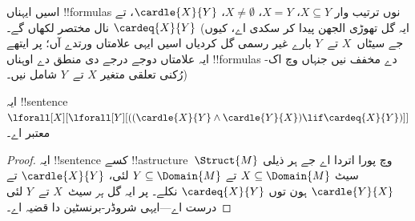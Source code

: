 \documentclass[../../../include/open-logic-section]{subfiles}
\begin{document}
اسیں ایہناں !!{formula}s نوں ترتیب وار $X \subseteq Y$،
$X = Y$، $X \neq \emptyset$، $\cardle{X}{Y}$، تے
$\cardeq{X}{Y}$ نال مختصر لکھاں گے۔ (ایہ گل تھوڑی الجھن پیدا کر
سکدی اے، کیوں جے سیٹاں~$X$ تے~$Y$ بارے غیر رسمی گل کردیاں اسیں
ایہی علامتاں ورتدے آں؛ پر ایتھے ایہ علامتاں دوجے درجے دی منطق دے
اوہناں !!{formula}s دے مخفف نیں جنہاں وچ اک-رُکنی تعلقی متغیر
$X$ تے~$Y$ شامل نیں۔)

\begin{prop}
ایہ !!{sentence} $\lforall[X][\lforall[Y][((\cardle{X}{Y} \land
    \cardle{Y}{X}) \lif \cardeq{X}{Y})]]$ معتبر اے۔
\end{prop}

\begin{proof}
ایہ !!{sentence} کسے !!a{structure}~$\Struct{M}$ وچ پورا اتردا اے جے
ہر ذیلی سیٹ $X \subseteq \Domain{M}$ تے $Y \subseteq \Domain{M}$ لئی،
$\cardle{X}{Y}$ تے $\cardle{Y}{X}$ ہون توں $\cardeq{X}{Y}$ نکلے۔
پر ایہ گل \emph{ہر} سیٹ~$X$ تے~$Y$ لئی درست اے---ایہی
شروڈر-برنسٹین دا قضیہ اے۔
\end{proof}
\end{document}
